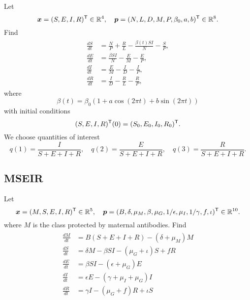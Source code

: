 \documentclass{siamltex}
\newcommand{\pvec}{\bm{p}}
\newcommand{\xvec}{\bm{x}}
\newcommand{\reals}{\mathbb R}
\begin{document}
Let
\begin{equation}
\xvec=(S,E,I,R)^{\sf T} \in \reals^4, \quad \pvec=(N,L,D,M,P,\beta_0,a,b)^{\sf T}\in\reals^8.
\end{equation}
Find
\begin{equation}
\begin{gathered}\begin{aligned}
\frac{dS}{dt} &= \frac{N}{P} + \frac{R}{L} - \frac{\beta(t) SI}{N} - \frac{S}{P}, \\
\frac{dE}{dt} &= \frac{\beta SI}{N} - \frac{E}{M} - \frac{E}{P},  \\
\frac{dI}{dt} &= \frac{E}{M} - \frac{I}{D} - \frac{I}{P}, \\
\frac{dR}{dt} &= \frac{I}{D} - \frac{R}{L} - \frac{R}{P},
\end{aligned}\end{gathered}
\end{equation}
where
\begin{equation}
\beta(t) = \beta_0(1+a \cos(2\pi t) + b\sin(2\pi t))
\end{equation}
with initial conditions
\begin{equation}
(S,E,I,R)^{\sf T}(0) = (S_0,E_0,I_0,R_0)^{\sf T}.
\end{equation}
We choose quantities of interest
\begin{equation}
q(1)= \frac{I}{S+E+I+R}, \quad q(2)= \frac{E}{S+E+I+R}, \quad q(3)= \frac{R}{S+E+I+R}.
\end{equation}


\subsection{MSEIR}

Let
\begin{equation}
\xvec=(M,S,E,I,R)^{\sf T} \in \reals^5, \quad \pvec=(B,\delta,\mu_M,\beta,\mu_G,1/\epsilon,\mu_I,1/\gamma,f, \iota)^{\sf T}\in\reals^{10}.
\end{equation}
where $M$ is the class protected by maternal antibodies.
Find
\begin{equation}\label{eq:MSEIRS}
\begin{gathered}\begin{aligned}
	\frac{dM}{dt} &= B(S+E+I+R)-(\delta+\mu_M) M \\
	\frac{dS}{dt} &= \delta M - \beta SI - (\mu_G+\iota) S  + fR \\
	\frac{dE}{dt} &= \beta SI - (\epsilon + \mu_G)E \\
	\frac{dI}{dt} &= \epsilon E - (\gamma+\mu_I+\mu_G)I\\
	\frac{dR}{dt} &= \gamma I - (\mu_G+f)R+\iota S
\end{aligned}\end{gathered}
\end{equation}
\end{document}
